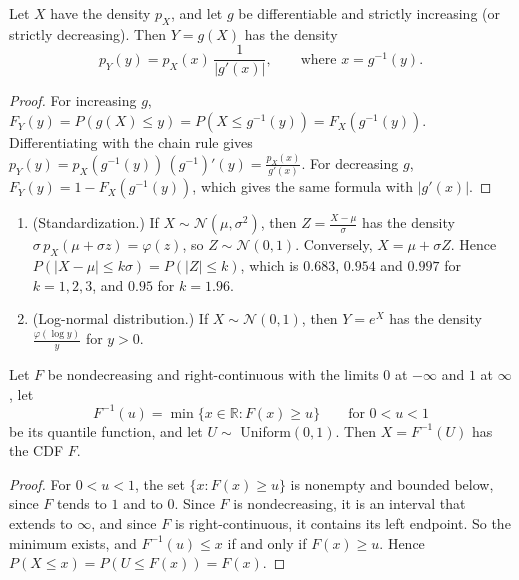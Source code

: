 \begin{proposition}\label{L4-prop:change-of-variables-1d}
    Let $X$ have the density $p_X$, and let $g$ be differentiable and strictly increasing (or strictly decreasing). Then $Y = g(X)$ has the density
    \[p_Y(y) = p_X(x)\,\frac{1}{|g'(x)|}, \qquad \text{where } x = g^{-1}(y).\]
\end{proposition}

\begin{proof}
    For increasing $g$, $F_Y(y) = P(g(X) \leq y) = P(X \leq g^{-1}(y)) = F_X(g^{-1}(y))$. Differentiating with the chain rule gives $p_Y(y) = p_X(g^{-1}(y))\,(g^{-1})'(y) = \frac{p_X(x)}{g'(x)}$. For decreasing $g$, $F_Y(y) = 1 - F_X(g^{-1}(y))$, which gives the same formula with $|g'(x)|$.
\end{proof}

\begin{example}\label{L4-ex:transformations}
    \begin{enumerate}
        \item (Standardization.) If $X \sim \mathcal{N}(\mu, \sigma^2)$, then $Z = \frac{X - \mu}{\sigma}$ has the density $\sigma\,p_X(\mu + \sigma z) = \varphi(z)$, so $Z \sim \mathcal{N}(0, 1)$. Conversely, $X = \mu + \sigma Z$. Hence $P(|X - \mu| \leq k\sigma) = P(|Z| \leq k)$, which is $0.683$, $0.954$ and $0.997$ for $k = 1, 2, 3$, and $0.95$ for $k = 1.96$.
        \item (Log-normal distribution.) If $X \sim \mathcal{N}(0, 1)$, then $Y = e^X$ has the density $\frac{\varphi(\log y)}{y}$ for $y > 0$.
    \end{enumerate}
\end{example}

\begin{theorem}\label{L4-thm:inverse-transform}
    Let $F$ be nondecreasing and right-continuous with the limits $0$ at $-\infty$ and $1$ at $\infty$, let
    \[F^{-1}(u) = \min\{x \in \mathbb{R} : F(x) \geq u\} \qquad \text{for } 0 < u < 1\]
    be its quantile function, and let $U \sim$ Uniform$(0, 1)$. Then $X = F^{-1}(U)$ has the CDF $F$.
\end{theorem}

\begin{proof}
    For $0 < u < 1$, the set $\{x : F(x) \geq u\}$ is nonempty and bounded below, since $F$ tends to $1$ and to $0$. Since $F$ is nondecreasing, it is an interval that extends to $\infty$, and since $F$ is right-continuous, it contains its left endpoint. So the minimum exists, and $F^{-1}(u) \leq x$ if and only if $F(x) \geq u$. Hence $P(X \leq x) = P(U \leq F(x)) = F(x)$.
\end{proof}

